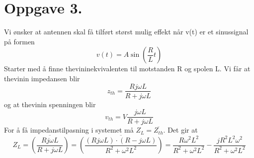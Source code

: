 \documentclass[a4paper,11pt,norsk]{article}
\begin{document}
\section*{Oppgave 3.}
Vi ønsker at antennen skal få tilført størst mulig effekt når v(t) er et sinussignal på formen
\[
    v(t) = A\sin{\left(\frac{R}{L}t\right)}
\]
Starter med å finne thevininekvivalenten til motstanden R og spolen L. Vi får at thevinin impedansen blir
\[
    z_{th} = \frac{R j \omega L}{R + j \omega L}
\]
og at thevinin spenningen blir
\[
    v_{th} = V \frac{j \omega L}{R + j \omega L}
\]
For å få impedanstilpasning i systemet må $Z_L = \overline{Z_{th}}$. Det gir at  
\[
    Z_L = \overline{\left(\frac{R j \omega L}{R + j \omega L}\right)} =  \overline{\left(\frac{(R j \omega L) \cdot (R - j \omega L)}{R^2 + \omega^2 L^2}\right)} = \frac{R \omega^2 L^2}{R^2 + \omega^2 L^2} - \frac{j R^2 L^2 \omega^2}{R^2 + \omega^2 L^2}
\]
\end{document}
